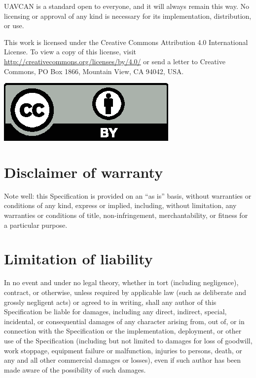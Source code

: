 \documentclass{uavcandoc}
\begin{document}
\begin{titlepage}
UAVCAN is a standard open to everyone, and it will always remain this way.
No licensing or approval of any kind is necessary for its implementation, distribution, or use.

This work is licensed under the Creative Commons Attribution 4.0 International License.
To view a copy of this license, visit \url{http://creativecommons.org/licenses/by/4.0/}
or send a letter to Creative Commons, PO Box 1866, Mountain View, CA 94042, USA.

\hspace*{\fill}\includegraphics[height=2\baselineskip]{cc-by}\hspace*{\fill}

\section*{Disclaimer of warranty}

Note well: this Specification is provided on an ``as is'' basis, without warranties or conditions of any kind,
express or implied, including, without limitation, any warranties or conditions of
title, non-infringement, merchantability, or fitness for a particular purpose.

\section*{Limitation of liability}

In no event and under no legal theory, whether in tort (including negligence), contract, or otherwise,
unless required by applicable law (such as deliberate and grossly negligent acts) or agreed to in writing,
shall any author of this Specification be liable for damages,
including any direct, indirect, special, incidental, or consequential damages of any character arising
from, out of, or in connection with the Specification or the implementation, deployment,
or other use of the Specification (including but not limited to damages for loss of goodwill,
work stoppage, equipment failure or malfunction, injuries to persons, death,
or any and all other commercial damages or losses),
even if such author has been made aware of the possibility of such damages.

\end{titlepage}
\end{document}
